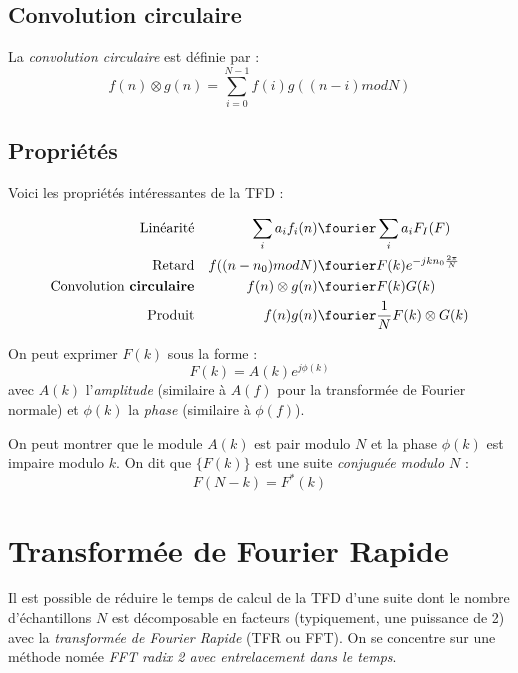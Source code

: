         \subsection{Convolution circulaire}
            La \textit{convolution circulaire} est définie par :
            $$
                f(n) \otimes g(n) = \sum_{i=0}^{N-1} f(i)g((n-i) mod N)
            $$

        \subsection{Propriétés}
            Voici les propriétés intéressantes de la TFD :

            \begin{align*}
                \text{Linéarité} && \sum_i a_if_i(n) &\fourier \sum_i a_i F_I(F)\\
                \text{Retard}  && f((n-n_0) mod N) &\fourier F(k) e^{-jkn_0\frac{2\pi}{N}}\\
                \text{Convolution \textbf{circulaire}} && f(n)\otimes g(n) &\fourier F(k)G(k)\\
                \text{Produit} && f(n)g(n) &\fourier \frac{1}{N}F(k)\otimes G(k)\\
            \end{align*}

            On peut exprimer $F(k)$ sous la forme :
            $$
                F(k) = A(k) e^{j\phi(k)}
            $$
            avec $A(k)$ l'\textit{amplitude} (similaire à $A(f)$ pour la transformée de Fourier normale) et $\phi(k)$ la \textit{phase} (similaire à $\phi(f)$).

            On peut montrer que le module $A(k)$ est pair modulo $N$ et la phase $\phi(k)$ est impaire modulo $k$. On dit que $\{F(k)\}$ est une suite \textit{conjuguée modulo $N$} :
            $$
                F(N - k) = F^*(k)
            $$

    \section{Transformée de Fourier Rapide}
        Il est possible de réduire le temps de calcul de la TFD d'une suite dont le nombre d'échantillons $N$ est décomposable en facteurs (typiquement, une puissance de 2) avec la \textit{transformée de Fourier Rapide} (TFR ou FFT). On se concentre sur une méthode nomée \textit{FFT radix 2 avec entrelacement dans le temps}.


